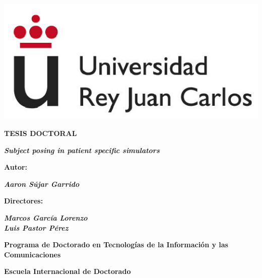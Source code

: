 \newcommand{\LyX}{L\kern-.1667em\lower.25em\hbox{Y}\kern-.125emX\spacefactor1000}
\newenvironment{LyXParagraphIndent}[1]%
{
  \begin{list}{}{%
    \setlength\topsep{0pt}%
    \addtolength{\leftmargin}{#1}
    \setlength\parsep{0pt plus 1pt}%
  }
  \item[]
}
{\end{list}}

\makeatother

\begin{center}

\thispagestyle{empty}

\vspace*{-0.5cm}

 {\includegraphics{IMG/logo_urjc.eps}} 

\vspace{1.5cm}

{\bf \huge  TESIS DOCTORAL}

\vspace{1.5cm}

{\bf \huge \itshape Subject posing in patient specific simulators}

\vspace{1.5cm}

  {\bf \large  Autor:}
  
  \vspace{0.5cm}
  {\bf \large \itshape Aaron Sújar Garrido}
 
  \vspace{1.5cm}
  
  {\bf Directores:}
  
   \vspace{0.5cm}
  {\bf \large \itshape Marcos García Lorenzo}
  \\
  {\bf \large \itshape Luis Pastor Pérez}
  
  \vspace{1.5cm}
  
{\bf Programa de Doctorado en Tecnologías de la Información y las Comunicaciones}

{\bf Escuela Internacional de Doctorado}

\vfill{}
\the\year

\end{center}
\thispagestyle{empty}
\reversemarginpar
